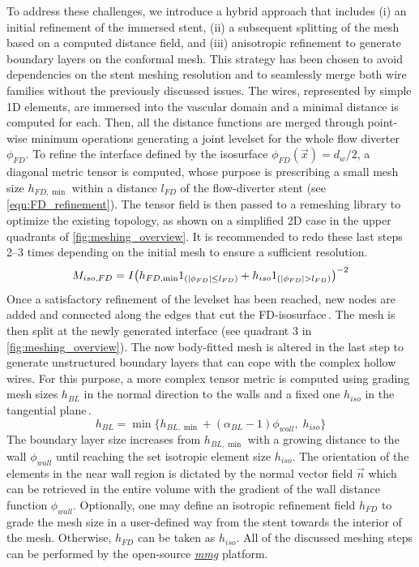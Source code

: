 To address these challenges, we introduce a hybrid approach that includes (i) an initial refinement of the immersed stent, (ii) a subsequent splitting of the mesh based on a computed distance field, and (iii) anisotropic refinement to generate boundary layers on the conformal mesh. This strategy has been chosen to avoid dependencies on the stent meshing resolution and to seamlessly merge both wire families without the previously discussed issues. The wires, represented by simple 1D elements, are immersed into the vascular domain and a minimal distance is computed for each. Then, all the distance functions are merged through point-wise minimum operations generating a joint levelset for the whole flow diverter $\phi_{FD}$. To refine the interface defined by the isosurface $\phi_{FD}(\vec{x})=d_w/2$, a diagonal metric tensor is computed, whose purpose is prescribing a small mesh size $h_{FD,\min}$ within a distance $l_{FD}$ of the flow-diverter stent (see \autoref{eqn:FD_refinement}). The tensor field is then passed to a remeshing library to optimize the existing topology, as shown on a simplified 2D case in the upper quadrants of \autoref{fig:meshing_overview}. It is recommended to redo these last steps 2--3 times depending on the initial mesh to ensure a sufficient resolution.
\begin{equation}
	M_{iso,FD} = I {\left(h_{FD,\min} 1_{(\left| \phi_{FD} \right| \leq l_{FD})} + h_{iso}1_{(\left| \phi_{FD} \right| > l_{FD})}\right)}^{-2}
	\label{eqn:FD_refinement}
\end{equation}
Once a satisfactory refinement of the levelset has been reached, new nodes are added and connected along the edges that cut the FD-isosurface\,\cite{dapogny2014}. The mesh is then split at the newly generated interface (see quadrant 3 in \autoref{fig:meshing_overview}). The now body-fitted mesh is altered in the last step to generate unstructured boundary layers that can cope with the complex hollow wires. For this purpose, a more complex tensor metric is computed using grading mesh sizes $h_{BL}$ in the normal direction to the walls and a fixed one $h_{iso}$ in the tangential plane\,\cite{Billon2017, Coupez2013}.
\begin{equation*}
	h_{BL} = \min{\{h_{BL,\min} + (\alpha_{BL} - 1)\phi_{wall}, \; h_{iso}\}}
\end{equation*}
The boundary layer size increases from $h_{BL,\min}$ with a growing distance to the wall $\phi_{wall}$ until reaching the set isotropic element size $h_{iso}$. The orientation of the elements in the near wall region is dictated by the normal vector field $\vec{n}$ which can be retrieved in the entire volume with the gradient of the wall distance function $\phi_{wall}$. Optionally, one may define an isotropic refinement field $h_{FD}$ to grade the mesh size in a user-defined way from the stent towards the interior of the mesh. Otherwise, $h_{FD}$ can be taken as $h_{iso}$. All of the discussed meshing steps can be performed by the open-source \href{https://www.mmgtools.org/}{\textit{mmg}} platform.
